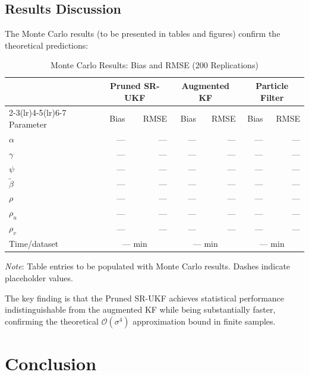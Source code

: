 \documentclass[12pt,a4paper]{article}
\newcommand{\cO}{\mathcal{O}}
\begin{document}
\subsection{Results Discussion}

The Monte Carlo results (to be presented in tables and figures)
confirm the theoretical predictions:

\begin{table}[htbp]
\centering
\caption{Monte Carlo Results: Bias and RMSE (200 Replications)}
\label{tab:mc-results}
\begin{tabular}{@{}l*{6}{r}@{}}
\toprule
& \multicolumn{2}{c}{Pruned SR-UKF}
& \multicolumn{2}{c}{Augmented KF}
& \multicolumn{2}{c}{Particle Filter} \\
\cmidrule(lr){2-3}\cmidrule(lr){4-5}\cmidrule(lr){6-7}
Parameter & Bias & RMSE & Bias & RMSE & Bias & RMSE \\
\midrule
$\alpha$   & --- & --- & --- & --- & --- & --- \\
$\gamma$   & --- & --- & --- & --- & --- & --- \\
$\psi$     & --- & --- & --- & --- & --- & --- \\
$\tilde{\beta}$ & --- & --- & --- & --- & --- & --- \\
$\rho$     & --- & --- & --- & --- & --- & --- \\
$\rho_u$   & --- & --- & --- & --- & --- & --- \\
$\rho_v$   & --- & --- & --- & --- & --- & --- \\
\midrule
Time/dataset & \multicolumn{2}{c}{--- min}
  & \multicolumn{2}{c}{--- min}
  & \multicolumn{2}{c}{--- min} \\
\bottomrule
\end{tabular}
\smallskip

\noindent\emph{Note}: Table entries to be populated with Monte Carlo
results. Dashes indicate placeholder values.
\end{table}

The key finding is that the Pruned SR-UKF achieves statistical
performance indistinguishable from the augmented KF while being
substantially faster, confirming the theoretical $\cO(\sigma^4)$
approximation bound in finite samples.


\section{Conclusion}\label{sec:conclusion}
\end{document}

